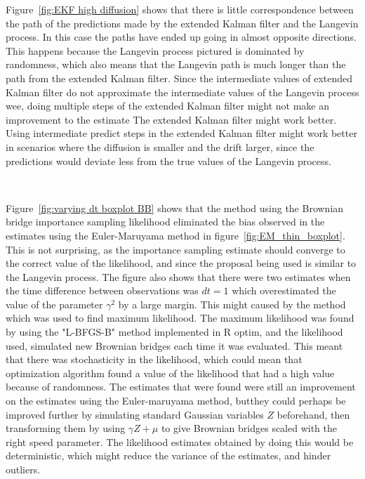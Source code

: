 Figure~\ref{fig:EKF high diffusion} shows that there is little correspondence between the path of the predictions made by the extended Kalman filter and the Langevin process. In this case the paths have ended up going in almost opposite directions. This happens because the Langevin process pictured is dominated by randomness, which also means that the Langevin path is much longer than the path from the extended Kalman filter. Since the intermediate values of extended Kalman filter do not approximate the intermediate values of the Langevin process wee, doing multiple steps of the extended Kalman filter might not make an improvement to the estimate
The extended Kalman filter might work better. Using intermediate predict steps in the extended Kalman filter might work better in scenarios where the diffusion is smaller and the drift larger, since the predictions would deviate less from the true values of the Langevin process.

\

Figure~\ref{fig:varying dt boxplot BB} shows that the method using the Brownian bridge importance sampling likelihood eliminated the bias observed in the estimates using the Euler-Maruyama method in figure~\ref{fig:EM_thin_boxplot}. This is not surprising, as the importance sampling estimate should converge to the correct value of the likelihood, and since the proposal being used is similar to the Langevin process. The figure also shows that there were two estimates when the time difference between observations was $dt=1$ which overestimated the value of the parameter $\gamma^2$ by a large margin. This might caused by the method which was used to find maximum likelihood. The maximum likelihood was found by using the "L-BFGS-B" method implemented in R optim, and the likelihood used, simulated new Brownian bridges each time it was evaluated. This meant that there was stochasticity in the likelihood, which could mean that optimization algorithm found a value of the likelihood that had a high value because of randomness. The estimates that were found were still an improvement on the estimates using the Euler-maruyama method, butthey could perhaps be improved further by simulating standard Gaussian variables $Z$ beforehand, then transforming them by using $\gamma Z +\mu$ to give Brownian bridges scaled with the right speed parameter. The likelihood estimates obtained by doing this would be deterministic, which might reduce the variance of the estimates, and hinder outliers.

\

